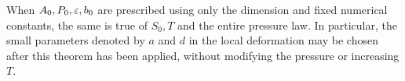 \begin{remark}\label{pressure:parameter-independence}
When $A_0,P_0,\varepsilon,b_0$ are prescribed using only the dimension and fixed
numerical constants, the same is true of $S_0,T$ and the entire pressure
law.  In particular, the small parameters denoted by $a$ and $d$ in the
local deformation may be chosen after this theorem has been applied,
without modifying the pressure or increasing $T$.
\end{remark}
